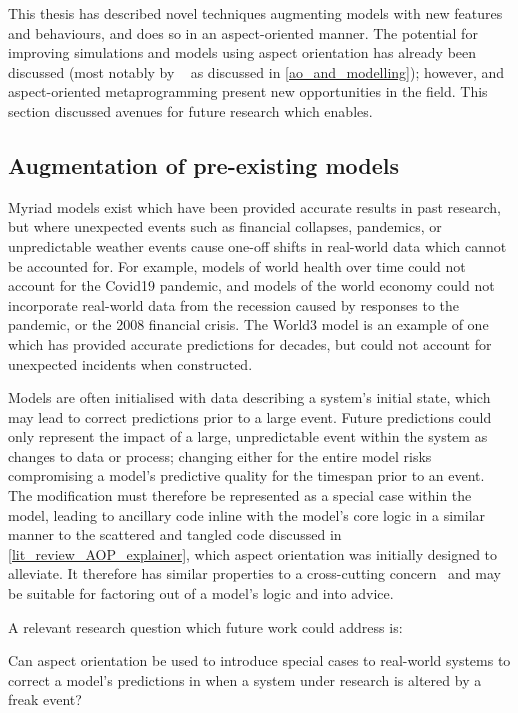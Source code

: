This thesis has described novel techniques augmenting models with new features
and behaviours, and does so in an aspect-oriented manner. The potential for
improving simulations and models using aspect orientation has already been
discussed (most notably by \citeauthor{gulyas1999use}~\cite{gulyas1999use} as
discussed in \cref{ao_and_modelling}); however, \pdsf and aspect-oriented
metaprogramming present new opportunities in the field. This section discussed
avenues for future research which \pdsf enables.


\subsection{Augmentation of pre-existing models}

Myriad models exist which have been provided accurate results in past research,
but where unexpected events such as financial collapses, pandemics, or
unpredictable weather events cause one-off shifts in real-world data which
cannot be accounted for. For example, models of world health over time could not
account for the Covid19 pandemic, and models of the world economy could not
incorporate real-world data from the recession caused by responses to the
pandemic, or the 2008 financial crisis. The World3 model is an example of one
which has provided accurate predictions for decades, but could not account for unexpected incidents when constructed.

Models are often initialised with data describing a system's initial state,
which may lead to correct predictions prior to a large event. Future predictions
could only represent the impact of a large, unpredictable event within the
system as changes to data or process; changing either for the entire model risks
compromising a model's predictive quality for the timespan prior to an event.
The modification must therefore be represented as a special case within the
model, leading to ancillary code inline with the model's core logic in a similar
manner to the scattered and tangled code discussed in
\cref{lit_review_AOP_explainer}, which aspect orientation was initially designed
to alleviate. It therefore has similar properties to a cross-cutting
concern~\cite{kiczales1997aspect} and may be suitable for factoring out of a
model's logic and into advice.

A relevant research question which future work could address is:

\begin{researchquestion}
Can aspect orientation be used to introduce special cases to real-world systems
to correct a model's predictions in when a system under research is altered by a
freak event?
\end{researchquestion}

